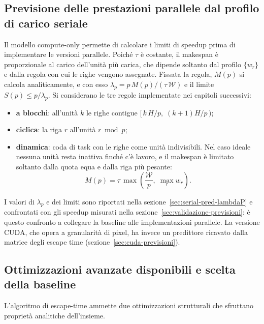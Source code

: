\subsection{Previsione delle prestazioni parallele dal profilo di carico seriale}
\label{sec:serial-predizione}
Il modello compute-only permette di calcolare i limiti di speedup prima di
implementare le versioni parallele. Poiché $\tau$ è costante, il makespan è
proporzionale al carico dell'unità più carica, che dipende soltanto dal profilo
$\{w_r\}$ e dalla regola con cui le righe vengono assegnate. Fissata la regola,
$M(p)$ si calcola analiticamente, e con esso
$\lambda_p = p\,M(p)/(\tau\,\mathcal{W})$ e il limite $S(p) \le p/\lambda_p$. Si
considerano le tre regole implementate nei capitoli successivi:
\begin{itemize}
    \item \textbf{a blocchi}: all'unità $k$ le righe contigue
    $[\,k\,H/p,\;(k{+}1)H/p\,)$;
    \item \textbf{ciclica}: la riga $r$ all'unità $r \bmod p$;
    \item \textbf{dinamica}: coda di task con le righe come unità indivisibili.
    Nel caso ideale nessuna unità resta inattiva finché c'è lavoro, e il makespan
    è limitato soltanto dalla quota equa e dalla riga più pesante:
    \[
        M(p) = \tau\,\max\!\left(\frac{\mathcal{W}}{p},\; \max_r w_r\right).
    \]
\end{itemize}

I valori di $\lambda_p$ e dei limiti sono riportati nella
sezione~\ref{sec:serial-pred-lambdaP} e confrontati con gli speedup misurati
nella sezione~\ref{sec:validazione-previsioni}: è questo confronto a collegare
la baseline alle implementazioni parallele. La versione CUDA, che opera a
granularità di pixel, ha invece un predittore ricavato dalla matrice degli
escape time (sezione~\ref{sec:cuda-previsioni}).

\subsection{Ottimizzazioni avanzate disponibili e scelta della baseline}
\label{sec:ottimizzazioni}
L'algoritmo di escape-time ammette due ottimizzazioni strutturali che
sfruttano proprietà analitiche dell'insieme.

